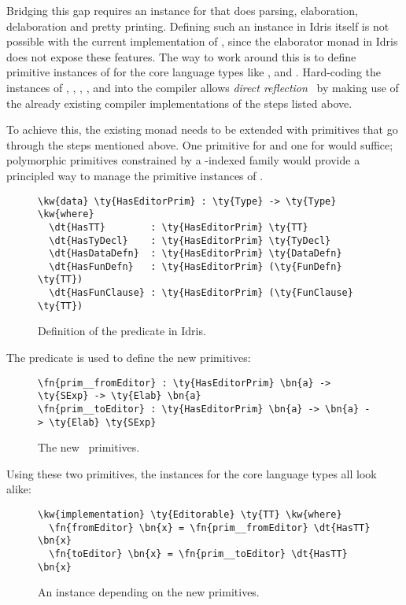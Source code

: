 Bridging this gap requires an \Editorable{} instance for \TT{} that does parsing,
elaboration, delaboration and pretty printing. Defining such an instance in
Idris itself is not possible with the current implementation of \Elab{}, since
the elaborator monad in Idris does not expose these features.
The way to work around this is to define primitive instances of \Editorable{}
for the core language types like \TT{}, \TyDecl{} and \FunDefn{}.
Hard-coding the \Editorable{} instances of , ,
, , and  into the compiler
allows \emph{direct reflection}~\cite{barzilayphd} by making use
of the already existing compiler implementations of the steps listed above.

To achieve this, the existing \Elab{} monad needs to be extended with
primitives that go through the steps mentioned above.  One \Elab{} primitive
for  and one for  would suffice; polymorphic
primitives constrained by a -indexed family would provide a principled
way to manage the primitive instances of \Editorable{}.

\begin{figure}[H]
\begin{Verbatim}
\kw{data} \ty{HasEditorPrim} : \ty{Type} -> \ty{Type} \kw{where}
  \dt{HasTT}        : \ty{HasEditorPrim} \ty{TT}
  \dt{HasTyDecl}    : \ty{HasEditorPrim} \ty{TyDecl}
  \dt{HasDataDefn}  : \ty{HasEditorPrim} \ty{DataDefn}
  \dt{HasFunDefn}   : \ty{HasEditorPrim} (\ty{FunDefn} \ty{TT})
  \dt{HasFunClause} : \ty{HasEditorPrim} (\ty{FunClause} \ty{TT})
\end{Verbatim}
\caption{Definition of the  predicate in Idris.}
\end{figure}

The  predicate is used to define the new \Elab{} primitives:

\begin{figure}[H]
\begin{Verbatim}
\fn{prim__fromEditor} : \ty{HasEditorPrim} \bn{a} -> \ty{SExp} -> \ty{Elab} \bn{a}
\fn{prim__toEditor} : \ty{HasEditorPrim} \bn{a} -> \bn{a} -> \ty{Elab} \ty{SExp}
\end{Verbatim}
  \caption{The new \Elab\ primitives.}
\label{code:newElabPrims}
\end{figure}

Using these two primitives, the \Editorable{} instances for the core language
types all look alike:

\begin{figure}[H]
\begin{Verbatim}
\kw{implementation} \ty{Editorable} \ty{TT} \kw{where}
  \fn{fromEditor} \bn{x} = \fn{prim__fromEditor} \dt{HasTT} \bn{x}
  \fn{toEditor} \bn{x} = \fn{prim__toEditor} \dt{HasTT} \bn{x}
\end{Verbatim}
  \caption{An \Editorable{} instance depending on the new primitives.}
\end{figure}


